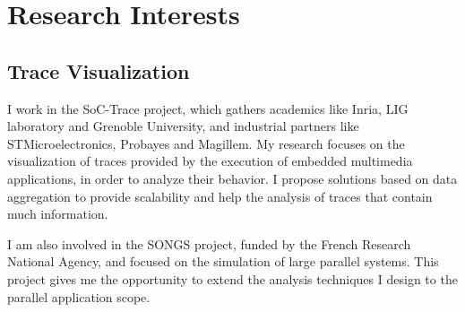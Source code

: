 \section{Research Interests}

\subsection{Trace Visualization}

%
{I work in the SoC-Trace project, which gathers academics like Inria, LIG 
laboratory and Grenoble University, and industrial partners like 
STMicroelectronics, Probayes and 
Magillem. My research focuses on the visualization of traces provided by 
the execution of embedded multimedia applications, in order to analyze their 
behavior. I propose solutions based on data aggregation to provide scalability 
and help the analysis of traces that contain much information.}

%
{I am also involved in the SONGS project, funded by the French 
Research National Agency, and focused on the simulation of large parallel 
systems. This project gives me the opportunity to extend the analysis 
techniques I design to the parallel application scope.}
